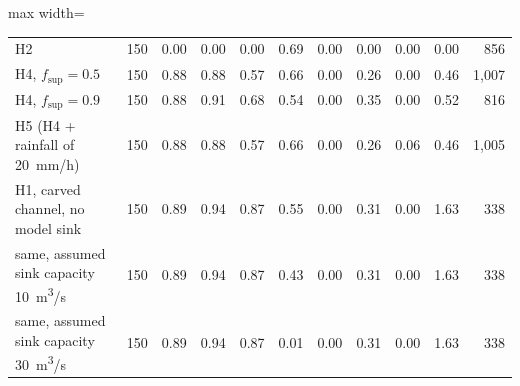 \begin{table}[htbp]
{\begin{adjustbox}{max width=\textwidth}
\begin{tabular}{llrrrrrrrrr}
H2 & 150 & 0.00 & 0.00 & 0.00 & 0.69 & 0.00 & 0.00 & 0.00 & 0.00 & 856\\
H4, $f_\mathrm{sup}=0.5$ & 150 & 0.88 & 0.88 & 0.57 & 0.66 & 0.00 & 0.26 & 0.00 & 0.46 & 1,007\\
H4, $f_\mathrm{sup}=0.9$ & 150 & 0.88 & 0.91 & 0.68 & 0.54 & 0.00 & 0.35 & 0.00 & 0.52 & 816\\
H5 (H4 + rainfall of \SI{20}{mm/h}) & 150 & 0.88 & 0.88 & 0.57 & 0.66 & 0.00 & 0.26 & 0.06 & 0.46 & 1,005\\
H1, carved channel, no model sink & 150 & 0.89 & 0.94 & 0.87 & 0.55 & 0.00 & 0.31 & 0.00 & 1.63 & 338\\
\quad same, assumed sink capacity \SI{10}{m^3/s} & 150 & 0.89 & 0.94 & 0.87 & 0.43 & 0.00 & 0.31 & 0.00 & 1.63 & 338\\
\quad same, assumed sink capacity \SI{30}{m^3/s} & 150 & 0.89 & 0.94 & 0.87 & 0.01 & 0.00 & 0.31 & 0.00 & 1.63 & 338\\
\bottomrule\end{tabular}\end{adjustbox}}
\end{table}

